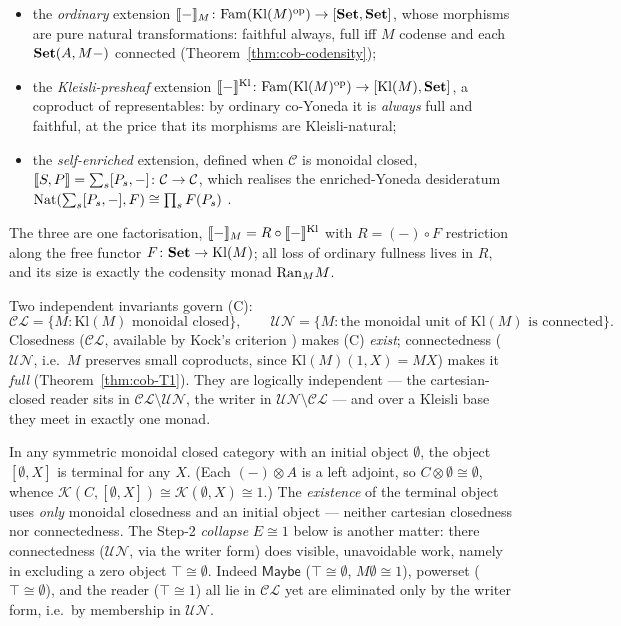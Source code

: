 \begin{itemize}
\item[\textbf{(A)}] the \emph{ordinary} extension
  $\llbracket - \rrbracket_M\colon\mathrm{Fam}(\mathrm{Kl}(M)^{\mathrm{op}})\to[\mathbf{Set},\mathbf{Set}]$, whose morphisms are
  pure natural transformations: faithful always, full iff $M$ codense and each
  $\mathbf{Set}(A,M{-})$ connected (Theorem~\ref{thm:cob-codensity});
\item[\textbf{(B)}] the \emph{Kleisli-presheaf} extension
  $\llbracket - \rrbracket^{\mathrm{Kl}}\colon\mathrm{Fam}(\mathrm{Kl}(M)^{\mathrm{op}})\to[\mathrm{Kl}(M),\mathbf{Set}]$,
  a coproduct of representables: by ordinary co-Yoneda it is \emph{always} full
  and faithful, at the price that its morphisms are Kleisli-natural;
\item[\textbf{(C)}] the \emph{self-enriched} extension, defined when
  $\mathcal{C}$ is monoidal closed, $\llbracket S,P \rrbracket=\sum_s[P_s,-]\colon\mathcal{C}\to
  \mathcal{C}$, which realises the enriched-Yoneda desideratum
  $\mathrm{Nat}(\sum_s[P_s,-],F)\cong\prod_s F(P_s)$ \cite{Kelly}.
\end{itemize}
The three are one factorisation, $\llbracket - \rrbracket_M=R\circ\llbracket - \rrbracket^{\mathrm{Kl}}$ with
$R=(-)\circ F$ restriction along the free functor $F\colon\mathbf{Set}\to\mathrm{Kl}(M)$;
all loss of ordinary fullness lives in $R$, and its size is exactly the codensity
monad $\mathrm{Ran}_M M$.

Two independent invariants govern (C):
\[
  \mathcal{CL}=\{M:\mathrm{Kl}(M)\text{ monoidal closed}\},\qquad
  \mathcal{UN}=\{M:\text{the monoidal unit of }\mathrm{Kl}(M)\text{ is connected}\}.
\]
Closedness ($\mathcal{CL}$, available by Kock's criterion \cite{KockMonoidal,KockClosed})
makes (C) \emph{exist}; connectedness ($\mathcal{UN}$, i.e.\ $M$ preserves small
coproducts, since $\mathrm{Kl}(M)(1,X)=MX$) makes it \emph{full}
(Theorem~\ref{thm:cob-T1}). They are logically independent --- the cartesian-closed
reader sits in $\mathcal{CL}\setminus\mathcal{UN}$, the writer in $\mathcal{UN}\setminus\mathcal{CL}$ --- and over a
Kleisli base they meet in exactly one monad.

\begin{lemma}\label{lem:cob-closedinitial}
In any symmetric monoidal closed category with an initial object $\emptyset$, the
object $[\emptyset,X]$ is terminal for any $X$. (Each $(-)\otimes A$ is a left
adjoint, so $C\otimes\emptyset\cong\emptyset$, whence
$\mathcal{K}(C,[\emptyset,X])\cong\mathcal{K}(\emptyset,X)\cong1$.) The
\emph{existence} of the terminal object uses \emph{only} monoidal closedness and
an initial object --- neither cartesian closedness nor connectedness. The Step-2
\emph{collapse} $E\cong1$ below is another matter: there connectedness
($\mathcal{UN}$, via the writer form) does visible, unavoidable work, namely in
excluding a zero object $\top\cong\emptyset$. Indeed $\mathsf{Maybe}$
($\top\cong\emptyset$, $M\emptyset\cong1$), powerset ($\top\cong\emptyset$), and
the reader ($\top\cong1$) all lie in $\mathcal{CL}$ yet are eliminated only by the
writer form, i.e.\ by membership in $\mathcal{UN}$.
\end{lemma}

